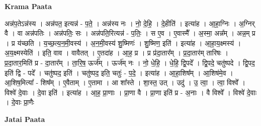 \documentclass[17pt]{extarticle}
\begin{document}
\textbf{Krama Paata} \newline

अन्न॑प॒तेऽन्न॑स्य । अन्न॑पत॒ इत्यन्न॑ - प॒ते॒ । अन्न॑स्य नः । नो॒ दे॒हि॒ । दे॒हीति॑ । इत्या॑ह । आ॒हा॒ग्निः । अ॒ग्निर् वै । वा अन्न॑पतिः । अन्न॑पतिः॒ सः । अन्न॑पति॒रित्यन्न॑ - प॒तिः॒ । स ए॒व । ए॒वास्मै᳚ । अ॒स्मा॒ अन्न᳚म् । अन्न॒म् प्र । 
प्र य॑च्छति । य॒च्छ॒त्य॒न॒मी॒वस्य॑ । अ॒न॒मी॒वस्य॑ शु॒ष्मिणः॑ । शु॒ष्मिण॒ इति॑ । इत्या॑ह । आ॒हा॒य॒क्ष्मस्य॑ । अ॒य॒क्ष्मस्येति॑ । इति॒ वाव । वावैतत् । ए॒तदा॑ह । आ॒ह॒ प्र । प्र प्र॑दा॒तार᳚म् । प्र॒दा॒तार॑म् तारिषः । प्र॒दा॒तार॒मिति॑ प्र - दा॒तार᳚म् । ता॒रि॒ष॒ ऊर्ज᳚म् । ऊर्ज॑म् नः । नो॒ धे॒हि॒ । धे॒हि॒ द्वि॒पदे᳚ । द्वि॒पदे॒ चतु॑ष्पदे । द्वि॒पद॒ इति॑ द्वि - पदे᳚ । चतु॑ष्पद॒ इति॑ । चतु॑ष्पद॒ इति॒ चतुः॑ - प॒दे॒ । इत्या॑ह । आ॒हा॒शिष᳚म् । आ॒शिष॑मे॒व । आ॒शिष॒मित्या᳚ - शिष᳚म् । ए॒वैताम् । ए॒तामा । आ शा᳚स्ते । शा॒स्त॒ उत् । उदु॑ । उ॒ त्वा॒ । त्वा॒ विश्वे᳚ । विश्वे॑ दे॒वाः । दे॒वा इति॑ । इत्या॑ह । आ॒ह॒ प्रा॒णाः । प्रा॒णा वै । प्रा॒णा इति॑ प्र - अ॒नाः । वै विश्वे᳚ । विश्वे॑ दे॒वाः । दे॒वाः प्रा॒णैः \newline

\textbf{Jatai Paata} \newline
\end{document}

